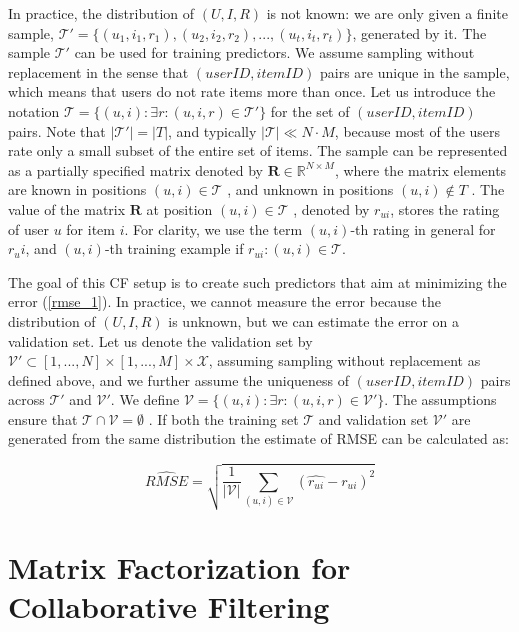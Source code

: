 \documentclass[11pt]{amsart}
\begin{document}
In practice, the distribution of $(U,I,R)$ is not known: we are only given a finite sample, $\mathcal{T}' = \{(u_1,i_1,r_1),(u_2,i_2,r_2),...,(u_t,i_t,r_t)\}$, generated by it. The sample $\mathcal{T}'$ can be used for training predictors. We assume sampling without replacement in the sense that $(user ID, item ID)$ pairs are unique in the sample, which means that users do not rate items more than once. Let us introduce the notation $\mathcal{T} =\{(u,i):\exists{r}:(u,i,r) \in \mathcal{T}' \}$ for the set of $(userID, itemID)$ pairs. Note that $|\mathcal{T}'|=|T|$, and typically $|\mathcal{T}| \ll N \cdot M$, because most of the users rate only a small subset of the entire set of items. The sample can be represented as a partially specified matrix denoted by $\mathbf{R} \in \mathbb{R}^{N \times M}$, where the matrix elements are known in positions $(u,i) \in \mathcal{T}$ , and unknown in positions $(u,i) \notin T$ . The value of the matrix $\mathbf{R}$ at position $(u,i) \in \mathcal{T}$ , denoted by $r_{ui}$, stores the rating of user $u$ for item $i$. For clarity, we use the term $(u,i)$-th rating in general for $r_ui$, and $(u,i)$-th training example if $r_{ui} : (u,i) \in \mathcal{T}$.

The goal of this CF setup is to create such predictors that aim at minimizing the error (\ref{rmse_1}). In practice, we cannot measure the error because the distribution of $(U,I,R)$ is unknown, but we can estimate the error on a validation set. Let us denote the validation set by $\mathcal{V}' \subset [1,...,N] \times [1,...,M] \times \mathcal{X}$, assuming sampling without replacement as defined above, and we further assume the uniqueness of $(userID,itemID)$ pairs across $\mathcal{T}'$ and $\mathcal{V}'$. We define $\mathcal{V} = \{(u,i):\exists{r}:(u,i,r) \in \mathcal{V'}\}$. The assumptions ensure that $\mathcal{T} \cap \mathcal{V} = \emptyset$ . If both the training set $\mathcal{T}$ and validation set $\mathcal{V}'$ are generated from the same distribution the estimate of RMSE can be calculated as:

\begin{equation}
  \label{rmse_2}
  \hat{RMSE} = \sqrt{\frac{1}{|\mathcal{V}|} \sum_{(u,i)\in\mathcal{V}} (\hat{r_{ui}} - r_{ui})^2}
\end{equation}

\section{Matrix Factorization for Collaborative Filtering}
\end{document}
